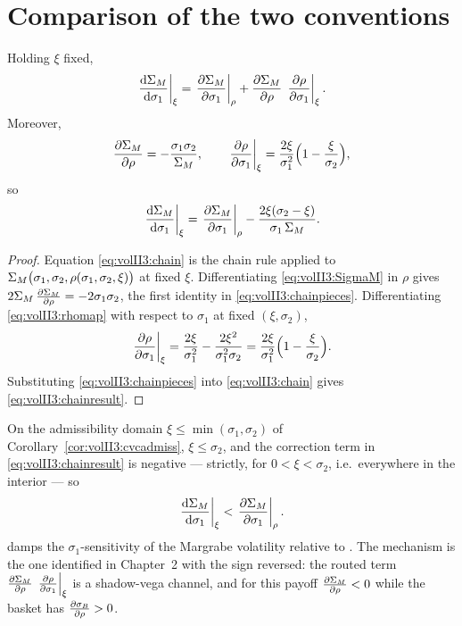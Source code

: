 \section{Comparison of the two conventions}
\label{sec:volII3:compare}

\begin{proposition}
\label{prop:volII3:chain}
Holding $\xi$ fixed,
\begin{equation}\label{eq:volII3:chain}
\left.\frac{\mathrm{d} \Sigma_M}{\mathrm{d} \sigma_1}\right|_{\xi}
= \left.\frac{\partial \Sigma_M}{\partial \sigma_1}\right|_{\rho}
+ \frac{\partial \Sigma_M}{\partial \rho}\,\left.\frac{\partial \rho}{\partial \sigma_1}\right|_{\xi} .
\end{equation}
Moreover,
\begin{equation}\label{eq:volII3:chainpieces}
\frac{\partial \Sigma_M}{\partial \rho} = -\frac{\sigma_1\sigma_2}{\Sigma_M},
\qquad
\left.\frac{\partial \rho}{\partial \sigma_1}\right|_{\xi}
= \frac{2\xi}{\sigma_1^2}\Bigl(1 - \frac{\xi}{\sigma_2}\Bigr),
\end{equation}
so
\begin{equation}\label{eq:volII3:chainresult}
\left.\frac{\mathrm{d} \Sigma_M}{\mathrm{d} \sigma_1}\right|_{\xi}
= \left.\frac{\partial \Sigma_M}{\partial \sigma_1}\right|_{\rho}
- \frac{2\xi(\sigma_2 - \xi)}{\sigma_1\,\Sigma_M} .
\end{equation}
\end{proposition}

\begin{proof}
Equation \eqref{eq:volII3:chain} is the chain rule applied to
$\Sigma_M\bigl(\sigma_1, \sigma_2, \rho(\sigma_1, \sigma_2, \xi)\bigr)$ at
fixed $\xi$. Differentiating \eqref{eq:volII3:SigmaM} in $\rho$ gives
$2\Sigma_M\,\frac{\partial \Sigma_M}{\partial \rho} = -2\sigma_1\sigma_2$, the first identity in
\eqref{eq:volII3:chainpieces}. Differentiating \eqref{eq:volII3:rhomap} with
respect to $\sigma_1$ at fixed $(\xi, \sigma_2)$,
\begin{equation}\label{eq:volII3:drho}
\left.\frac{\partial \rho}{\partial \sigma_1}\right|_{\xi}
= \frac{2\xi}{\sigma_1^2} - \frac{2\xi^2}{\sigma_1^2\sigma_2}
= \frac{2\xi}{\sigma_1^2}\Bigl(1 - \frac{\xi}{\sigma_2}\Bigr).
\end{equation}
Substituting \eqref{eq:volII3:chainpieces} into \eqref{eq:volII3:chain} gives
\eqref{eq:volII3:chainresult}.
\end{proof}

\begin{remark}[Sign]\label{rem:volII3:sign}
On the admissibility domain $\xi \le \min(\sigma_1, \sigma_2)$ of
Corollary~\ref{cor:volII3:cvcadmiss}, $\xi \le \sigma_2$, and the
correction term in \eqref{eq:volII3:chainresult} is negative --- strictly, for
$0 < \xi < \sigma_2$, i.e.\ everywhere in the interior --- so
\begin{equation}\label{eq:volII3:signineq}
\left.\frac{\mathrm{d} \Sigma_M}{\mathrm{d} \sigma_1}\right|_{\xi} < \left.\frac{\partial \Sigma_M}{\partial \sigma_1}\right|_{\rho} .
\end{equation}
\stickycvc{} damps the $\sigma_1$-sensitivity of the Margrabe volatility
relative to \stickyrho{}. The mechanism is the one identified in Chapter~2 with
the sign reversed: the routed term
$\frac{\partial \Sigma_M}{\partial \rho}\,\left.\frac{\partial \rho}{\partial \sigma_1}\right|_{\xi}$ is a shadow-vega
channel, and for this payoff $\frac{\partial \Sigma_M}{\partial \rho} < 0$ while the basket has
$\frac{\partial \sigma_B}{\partial \rho} > 0$.
\end{remark}

